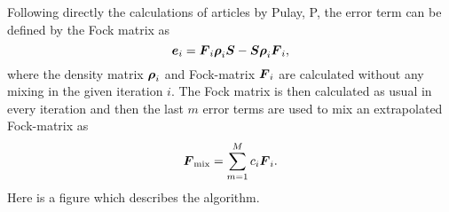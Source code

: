     Following directly the calculations of articles \cite{PULAY,PULAY2} by
    Pulay, P, the error term can be defined by the Fock matrix as
        \begin{equation}
            \boldsymbol{{e}}_i = \boldsymbol{{F}}_i\boldsymbol{{\rho}}_i\boldsymbol{{S}} -
            \boldsymbol{{S}}\boldsymbol{{\rho}}_i\boldsymbol{{F}}_i,
        \end{equation}
    where the density matrix $\boldsymbol{{\rho}}_i$ and Fock-matrix $\boldsymbol{{F}}_i$ are
    calculated without any mixing in the given iteration $i$. The Fock matrix
    is then calculated as usual in every iteration and then the last $m$ error
    terms are used to mix an extrapolated Fock-matrix as
        \begin{equation}
            \blds{F}_{\text{mix}} = \suml{m=1}{M}c_i\blds{F}_i.
            \label{eq:extrapolF}
        \end{equation}
    Here is a figure which describes the algorithm.
